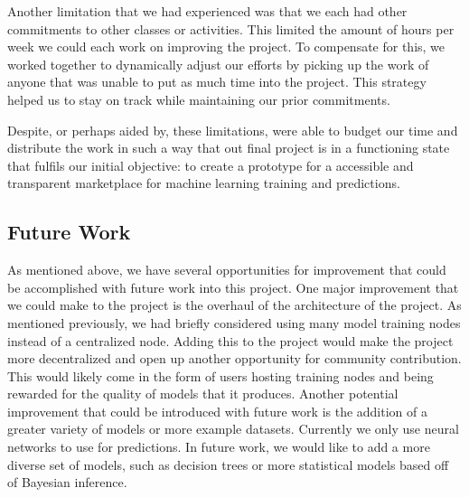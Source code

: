 \documentclass{article}
\begin{document}
    Another limitation that we had experienced was that we each had other commitments to other classes or activities.
    This limited the amount of hours per week we could each work on improving the project.  To compensate for this, we
    worked together to dynamically adjust our efforts by picking up the work of anyone that was unable to put as much
    time into the project. This strategy helped us to stay on track while maintaining our prior commitments.

    Despite, or perhaps aided by, these limitations, were able to budget our time and distribute the work in such a way
    that out final project is in a functioning state that fulfils our initial objective: to create a prototype for a
    accessible and transparent marketplace for machine learning training and predictions.

    \subsection{Future Work}

    As mentioned above, we have several opportunities for improvement that could be accomplished with future work
    into this project.  One major improvement that we could make to the project is the overhaul of the architecture of
    the project.  As mentioned previously, we had briefly considered using many model training nodes instead of a
    centralized node.  Adding this to the project would make the project more decentralized and open up another opportunity
    for community contribution.  This would likely come in the form of users hosting training nodes and being rewarded for
    the quality of models that it produces.  Another potential improvement that could be introduced with future work is
    the addition of a greater variety of models or more example datasets.  Currently we only use neural networks to
    use for predictions.  In future work, we would like to add a more diverse set of models, such as decision trees or
    more statistical models based off of Bayesian inference.

    \pagebreak
    
    
\end{document}
